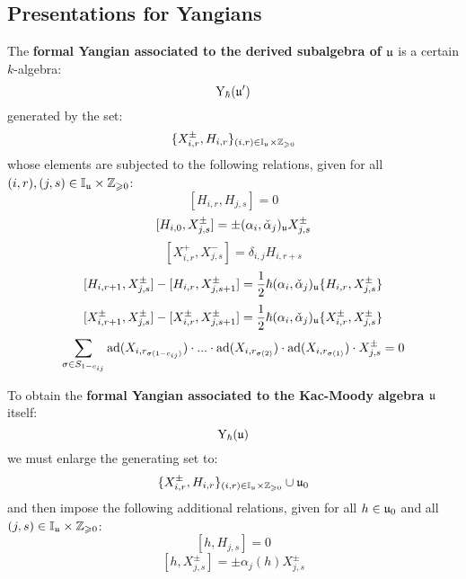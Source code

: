     \subsection{Presentations for Yangians}
        \begin{definition} \label{def: formal_yangians_associated_to_symmetrisable_kac_moody_algebras}
            The \textbf{formal Yangian associated to the derived subalgebra of $\mathfrak{u}$} is a certain $k$-algebra:
                $$\mathrm{Y}_{\hbar}(\mathfrak{u}')$$
            generated by the set:
                $$\{X_{i, r}^{\pm}, H_{i, r}\}_{(i, r) \in \simpleroots_{\fraku} \x \Z_{\geq 0}}$$
            whose elements are subjected to the following relations, given for all $(i, r), (j, s) \in \simpleroots_{\fraku} \x \Z_{\geq 0}$:
                $$[H_{i, r}, H_{j, s}] = 0$$
                $$[H_{i, 0}, X_{j, s}^{\pm}] = \pm (\alpha_i, \check{\alpha}_j)_{\mathfrak{u}} X_{j, s}^{\pm}$$
                $$[X_{i, r}^+, X_{j, s}^-] = \delta_{i, j} H_{i, r + s}$$
                $$[H_{i, r + 1}, X^{\pm}_{j, s}] - [H_{i, r}, X^{\pm}_{j, s + 1}] = \frac12 \hbar (\alpha_i, \check{\alpha}_j)_{\mathfrak{u}} \{H_{i, r}, X^{\pm}_{j, s}\}$$
                $$[X^{\pm}_{i, r + 1}, X^{\pm}_{j, s}] - [X^{\pm}_{i, r}, X^{\pm}_{j, s + 1}] = \frac12 \hbar (\alpha_i, \check{\alpha}_j)_{\mathfrak{u}} \{X^{\pm}_{i, r}, X^{\pm}_{j, s}\}$$
                $$\sum_{ \sigma \in S_{1 - c_{ij}} } \mathrm{ad}(X_{ i, r_{\sigma(1 - c_{ij})} }) \cdot ... \cdot \mathrm{ad}(X_{ i, r_{\sigma(2)} }) \cdot \mathrm{ad}(X_{ i, r_{\sigma(1)} }) \cdot X_{j, s}^{\pm} = 0$$
                
            To obtain the \textbf{formal Yangian associated to the Kac-Moody algebra $\mathfrak{u}$} itself:
                $$\mathrm{Y}_{\hbar}(\mathfrak{u})$$
            we must enlarge the generating set to:
                $$\{X_{i, r}^{\pm}, H_{i, r}\}_{(i, r) \in \simpleroots_{\fraku} \x \Z_{\geq 0}} \cup \fraku_0$$
            and then impose the following additional relations, given for all $h \in \mathfrak{u}_0$ and all $(j, s) \in \simpleroots_{\fraku} \x \Z_{\geq 0}$:
                $$[h, H_{j, s}] = 0$$
                $$[h, X_{j, s}^{\pm}] = \pm \alpha_j(h) X_{j, s}^{\pm}$$
        \end{definition}
